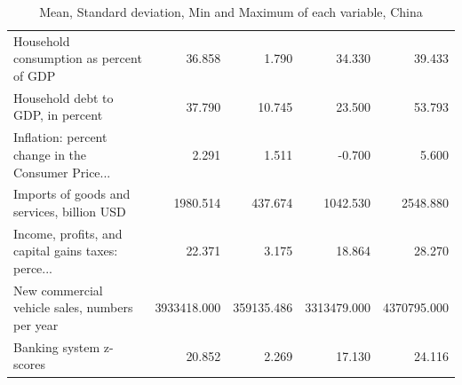 \documentclass[11pt]{article}
\begin{document}
\begin{table}[H]
{\begin{tabular}{lrrrr}
Household consumption as percent of GDP            &       36.858 &       1.790 &       34.330 &       39.433 \\
Household debt to GDP, in percent                  &       37.790 &      10.745 &       23.500 &       53.793 \\
Inflation: percent change in the Consumer Price... &        2.291 &       1.511 &       -0.700 &        5.600 \\
Imports of goods and services, billion USD         &     1980.514 &     437.674 &     1042.530 &     2548.880 \\
Income, profits, and capital gains taxes: perce... &       22.371 &       3.175 &       18.864 &       28.270 \\
New commercial vehicle sales, numbers per year     &  3933418.000 &  359135.486 &  3313479.000 &  4370795.000 \\
Banking system z-scores                            &       20.852 &       2.269 &       17.130 &       24.116 \\
\bottomrule
\end{tabular}}
\caption{Mean, Standard deviation, Min and Maximum of each variable, China}
\label{tab:describe_chn}
\end{table}
\end{document}
